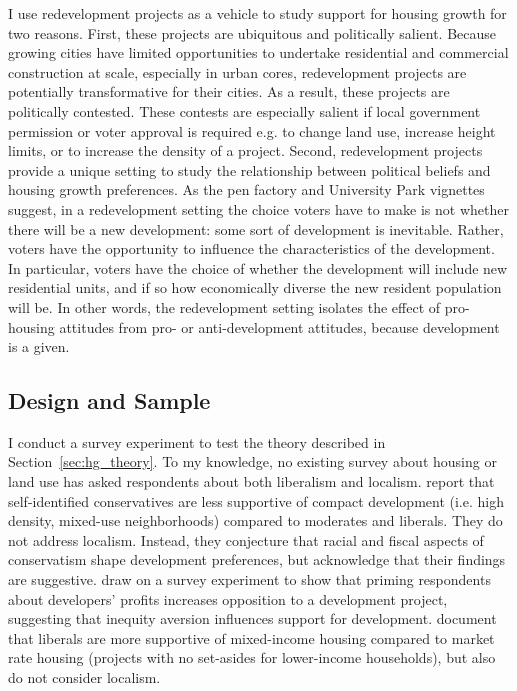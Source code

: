 \documentclass[article,12pt]{memoir}
\begin{document}
I use redevelopment projects as a vehicle to study support for housing growth for two reasons.  First, these projects are ubiquitous and politically salient.  Because growing cities have limited opportunities to undertake residential and commercial construction at scale, especially in urban cores, redevelopment projects are potentially transformative for their cities. As a result, these projects are politically contested.  These contests are especially salient if local government permission or voter approval is required e.g. to change land use, increase height limits, or to increase the density of a project.  Second, redevelopment projects provide a unique setting to study the relationship between political beliefs and housing growth preferences.  As the pen factory and University Park vignettes suggest, in a redevelopment setting the choice voters have to make is not whether there will be a new development: some sort of development is inevitable.  Rather, voters have the opportunity to influence the characteristics of the development.  In particular, voters have the choice of whether the development will include new residential units, and if so how  economically diverse the new resident population will be.  In other words, the redevelopment setting isolates the effect of pro-housing attitudes from pro- or anti-development attitudes, because development is a given.

\subsection{Design and Sample}

I conduct a survey experiment to test the theory described in Section~\ref{sec:hg_theory}.  To my knowledge, no existing survey about housing or land use has asked respondents about both liberalism and localism. \citet{lewis_complexity_2010} report that self-identified conservatives are less supportive of compact development (i.e. high density, mixed-use neighborhoods) compared to moderates and liberals. They do not address localism.  Instead, they conjecture that racial and fiscal aspects of conservatism shape development preferences, but acknowledge that their findings are suggestive. \citet{monkkonen_opposition_2018-1} draw on a survey experiment to show that priming respondents about developers' profits increases opposition to a development project, suggesting that inequity aversion influences support for development. \citet{marble_where_2018} document that liberals are more supportive of mixed-income housing compared to market rate housing (projects with no set-asides for lower-income households), but also do not consider localism. 
\end{document}
